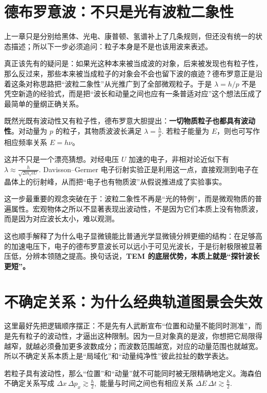 \documentclass[lang=cn,11pt]{elegantbook}
\begin{document}
\section{德布罗意波：不只是光有波粒二象性}

上一章只是分别给黑体、光电、康普顿、氢谱补上了几条规则，但还没有统一的状态描述；所以下一步必须追问：粒子本身是不是也该用波来表述。

真正该先有的疑问是：如果光这种本来被当成波的对象，后来被发现也有粒子性，那么反过来，那些本来被当成粒子的对象会不会也留下波的痕迹？德布罗意正是沿着这条对称思路把“波粒二象性”从光推广到了全部微观粒子。于是 \(\lambda=h/p\) 不是凭空新造的经验式，而是把“波长和动量之间也应有一条普适对应”这个想法压成了最简单的量纲正确关系。

既然光既有波动性又有粒子性，德布罗意大胆提出：\textbf{一切物质粒子也都具有波动性}。对动量为 \(p\) 的粒子，其物质波波长满足
 \(\lambda=\frac{h}{p}.\) 
若粒子能量为 \(E\)，则也可写作相应频率关系 \(E=h\nu\)。

这并不只是一个漂亮猜想。对经电压 \(U\) 加速的电子，非相对论近似下有
 \(\lambda\approx \frac{h}{\sqrt{2m_e eU}}.\) 
Davisson--Germer 电子衍射实验正是利用这一点，直接观测到电子在晶体上的衍射峰，从而把“电子也有物质波”从假说推进成了实验事实。

这一步最重要的观念突破在于：波粒二象性不再是“光的特例”，而是微观物质的普遍属性。宏观物体之所以不显著表现出波动性，不是因为它们本质上没有物质波，而是因为对应波长太小，难以观测。

\begin{remark}
这也顺手解释了为什么电子显微镜能比普通光学显微镜分辨更细的结构：在足够高的加速电压下，电子的德布罗意波长可以远小于可见光波长，于是衍射极限被显著压低，分辨本领随之提高。换句话说，\textbf{TEM 的底层优势，本质上就是“探针波长更短”。}
\end{remark}

\section{不确定关系：为什么经典轨道图景会失效}

这里最好先把逻辑顺序摆正：不是先有人武断宣布“位置和动量不能同时测准”，而是先有粒子的波动性，才逼出这种限制。因为一旦对象真的是波，你想把它局限得越窄，就越必须叠加更多波数成分；而波数范围越宽，对应的动量范围也就越宽。所以不确定关系本质上是“局域化”和“动量纯净性”彼此拉扯的数学表达。

若粒子具有波动性，那么“位置”和“动量”就不可能同时被无限精确地定义。海森伯不确定关系写成
 \(\Delta x\,\Delta p_x\gtrsim \frac{\hbar}{2},\) 
能量与时间之间也有相应关系
 \(\Delta E\,\Delta t\gtrsim \frac{\hbar}{2}.\) 
\end{document}
